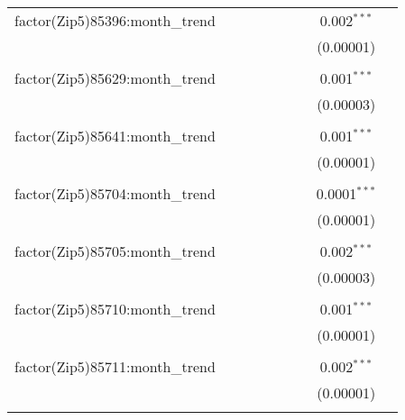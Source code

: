 \begin{table}[H]
{\begin{tabular}{@{\extracolsep{5pt}}lcccccccc}
  factor(Zip5)85396:month\_trend &  &  &  &  &  &  & 0.002$^{***}$ &  \\  

   &  &  &  &  &  &  & (0.00001) &  \\  

   & & & & & & & & \\  

  factor(Zip5)85629:month\_trend &  &  &  &  &  &  & 0.001$^{***}$ &  \\  

   &  &  &  &  &  &  & (0.00003) &  \\  

   & & & & & & & & \\  

  factor(Zip5)85641:month\_trend &  &  &  &  &  &  & 0.001$^{***}$ &  \\  

   &  &  &  &  &  &  & (0.00001) &  \\  

   & & & & & & & & \\  

  factor(Zip5)85704:month\_trend &  &  &  &  &  &  & 0.0001$^{***}$ &  \\  

   &  &  &  &  &  &  & (0.00001) &  \\  

   & & & & & & & & \\  

  factor(Zip5)85705:month\_trend &  &  &  &  &  &  & 0.002$^{***}$ &  \\  

   &  &  &  &  &  &  & (0.00003) &  \\  

   & & & & & & & & \\  

  factor(Zip5)85710:month\_trend &  &  &  &  &  &  & 0.001$^{***}$ &  \\  

   &  &  &  &  &  &  & (0.00001) &  \\  

   & & & & & & & & \\  

  factor(Zip5)85711:month\_trend &  &  &  &  &  &  & 0.002$^{***}$ &  \\  

   &  &  &  &  &  &  & (0.00001) &  \\  

   & & & & & & & & \\  


\end{tabular}}
\end{table}
